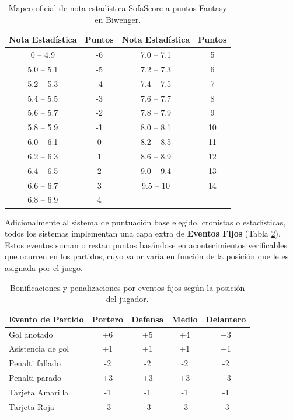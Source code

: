 \begin{table}[H]
    \centering
    \begin{tabular}{|c|c|c|c|}
        \hline
        \textbf{Nota Estadística} & \textbf{Puntos} & \textbf{Nota Estadística} & \textbf{Puntos} \\
        \hline
        0 -- 4.9 & -6 & 7.0 -- 7.1 & 5 \\ \hline
        5.0 -- 5.1 & -5 & 7.2 -- 7.3 & 6 \\ \hline
        5.2 -- 5.3 & -4 & 7.4 -- 7.5 & 7 \\ \hline
        5.4 -- 5.5 & -3 & 7.6 -- 7.7 & 8 \\ \hline
        5.6 -- 5.7 & -2 & 7.8 -- 7.9 & 9 \\ \hline
        5.8 -- 5.9 & -1 & 8.0 -- 8.1 & 10 \\ \hline
        6.0 -- 6.1 & 0 & 8.2 -- 8.5 & 11 \\ \hline
        6.2 -- 6.3 & 1 & 8.6 -- 8.9 & 12 \\ \hline
        6.4 -- 6.5 & 2 & 9.0 -- 9.4 & 13 \\ \hline
        6.6 -- 6.7 & 3 & 9.5 -- 10 & 14 \\ \hline
        6.8 -- 6.9 & 4 & \multicolumn{2}{c|}{} \\ \hline
    \end{tabular}
    \caption{Mapeo oficial de nota estadística SofaScore a puntos Fantasy en Biwenger.}
    \label{tab:puntos_sofascore}
\end{table}

Adicionalmente al sistema de puntuación base elegido, cronistas o estadísticas, todos los sistemas implementan una capa extra de \textbf{Eventos Fijos} (Tabla \ref{tab:eventos_fijos}). Estos eventos suman o restan puntos basándose en acontecimientos verificables que ocurren en los partidos, cuyo valor varía en función de la posición que le es asignada por el juego.

\begin{table}[H]
    \centering
    \begin{tabular}{|l|c|c|c|c|}
        \hline
        \textbf{Evento de Partido} & \textbf{Portero} & \textbf{Defensa} & \textbf{Medio} & \textbf{Delantero} \\
        \hline
        Gol anotado & +6 & +5 & +4 & +3 \\
        \hline
        Asistencia de gol & +1 & +1 & +1 & +1 \\
        \hline
        Penalti fallado & -2 & -2 & -2 & -2 \\
        \hline
        Penalti parado & +3 & +3 & +3 & +3 \\
        \hline
        Tarjeta Amarilla & -1 & -1 & -1 & -1 \\
        \hline
        Tarjeta Roja & -3 & -3 & -3 & -3 \\
        \hline
    \end{tabular}
    \caption{Bonificaciones y penalizaciones por eventos fijos según la posición del jugador.}
    \label{tab:eventos_fijos}
\end{table}

